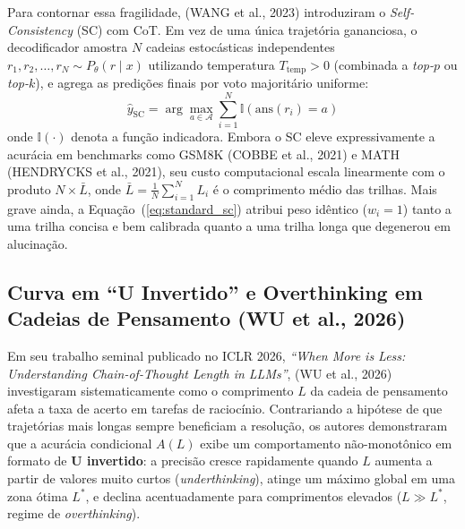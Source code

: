 \documentclass[9pt,conference]{IEEEtran}
\begin{document}
Para contornar essa fragilidade, (WANG et al., 2023) introduziram o \textit{Self-Consistency} (SC) com CoT. Em vez de uma \'{u}nica trajet\'{o}ria gananciosa, o decodificador amostra $N$ cadeias estoc\'{a}sticas independentes $r_1, r_2, \dots, r_N \sim P_\theta(r \mid x)$ utilizando temperatura $T_{\text{temp}} > 0$ (combinada a \textit{top-$p$} ou \textit{top-$k$}), e agrega as predi\c{c}\~{o}es finais por voto majorit\'{a}rio uniforme:
\begin{equation}
\hat{y}_{\text{SC}} = \arg\max_{a \in \mathcal{A}} \sum_{i=1}^{N} \mathbb{I}\left(\text{ans}(r_i) = a\right)
\label{eq:standard_sc}
\end{equation}
onde $\mathbb{I}(\cdot)$ denota a fun\c{c}\~{a}o indicadora. Embora o SC eleve expressivamente a acur\'{a}cia em benchmarks como GSM8K (COBBE et al., 2021) e MATH (HENDRYCKS et al., 2021), seu custo computacional escala linearmente com o produto $N \times \bar{L}$, onde $\bar{L} = \frac{1}{N}\sum_{i=1}^N L_i$ \'{e} o comprimento m\'{e}dio das trilhas. Mais grave ainda, a Equa\c{c}\~{a}o~(\ref{eq:standard_sc}) atribui peso id\^{e}ntico ($w_i = 1$) tanto a uma trilha concisa e bem calibrada quanto a uma trilha longa que degenerou em alucina\c{c}\~{a}o.

\subsection{Curva em ``U Invertido'' e Overthinking em Cadeias de Pensamento (WU et al., 2026)}

Em seu trabalho seminal publicado no ICLR 2026, \textit{``When More is Less: Understanding Chain-of-Thought Length in LLMs''}, (WU et al., 2026) investigaram sistematicamente como o comprimento $L$ da cadeia de pensamento afeta a taxa de acerto em tarefas de racioc\'{i}nio. Contrariando a hip\'{o}tese de que trajet\'{o}rias mais longas sempre beneficiam a resolu\c{c}\~{a}o, os autores demonstraram que a acur\'{a}cia condicional $A(L)$ exibe um comportamento n\~{a}o-monot\^{o}nico em formato de \textbf{U invertido}: a precis\~{a}o cresce rapidamente quando $L$ aumenta a partir de valores muito curtos (\textit{underthinking}), atinge um m\'{a}ximo global em uma zona \'{o}tima $L^*$, e declina acentuadamente para comprimentos elevados ($L \gg L^*$, regime de \textit{overthinking}).
\end{document}

